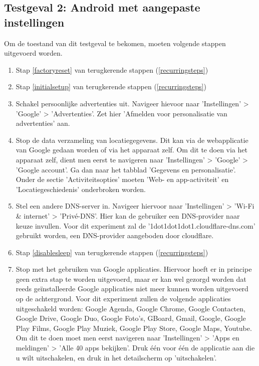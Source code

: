 \subsection{Testgeval 2: Android met aangepaste instellingen}

Om de toestand van dit testgeval te bekomen, moeten volgende stappen uitgevoerd worden.

\begin{enumerate}
    \item Stap \ref{factoryreset} van terugkerende stappen (\ref{recurringsteps})
    \item Stap \ref{initialsetup} van terugkerende stappen (\ref{recurringsteps})
    \item Schakel persoonlijke advertenties uit. Navigeer hievoor naar 'Instellingen' > 'Google' > 'Advertenties'. Zet hier 'Afmelden voor personalisatie van advertenties' aan.
    \item Stop de data verzameling van locatiegegevens. Dit kan via de webapplicatie van Google gedaan worden of via het apparaat zelf. Om dit te doen via het apparaat zelf, dient men eerst te navigeren naar 'Instellingen' > 'Google' > 'Google account'. Ga dan naar het tabblad 'Gegevens en personalisatie'. Onder de sectie 'Activiteitsopties' moeten 'Web- en app-activiteit' en 'Locatiegeschiedenis' onderbroken worden.
    \item Stel een andere DNS-server in. Navigeer hiervoor naar 'Instellingen' > 'Wi-Fi \& internet' > 'Privé-DNS'. Hier kan de gebruiker een DNS-provider naar keuze invullen. Voor dit experiment zal de '1dot1dot1dot1.cloudflare-dns.com' gebruikt worden, een DNS-provider aangeboden door cloudflare.
    \item Stap \ref{disablesleep} van terugkerende stappen (\ref{recurringsteps})
    \item Stop met het gebruiken van Google applicaties. Hiervoor hoeft er in principe geen extra stap te worden uitgevoerd, maar er kan wel gezorgd worden dat reeds geïnstalleerde Google applicaties niet meer kunnen worden uitgevoerd op de achtergrond. Voor dit experiment zullen de volgende applicaties uitgeschakeld worden: Google Agenda, Google Chrome, Google Contacten, Google Drive, Google Duo, Google Foto's, GBoard, Gmail, Google, Google Play Films, Google Play Muziek, Google Play Store, Google Maps, Youtube. Om dit te doen moet men eerst navigeren naar 'Instellingen' > 'Apps en meldingen' > 'Alle 40 apps bekijken'. Druk één voor één de applicatie aan die u wilt uitschakelen, en druk in het detailscherm op 'uitschakelen'.
\end{enumerate}
    
